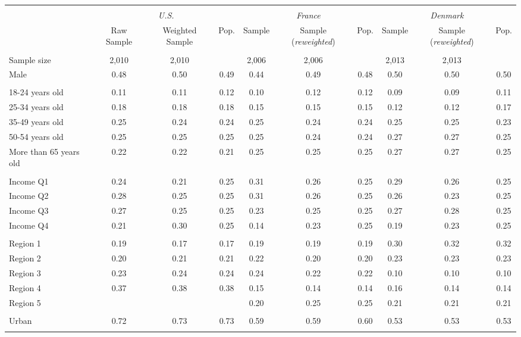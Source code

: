 \begin{tabular}{lccccccccc}
\toprule
\hline \\[-1.8ex]
\multicolumn{1}{c}{\em{ }} & \multicolumn{3}{c}{\em{U.S.}} & \multicolumn{3}{c}{\em{France}} & \multicolumn{3}{c}{\em{Denmark}}\\
\cmidrule(l{3pt}r{3pt}){2-4} \cmidrule(l{3pt}r{3pt}){5-7} \cmidrule(l{3pt}r{3pt}){8-10}
\noalign{\smallskip}  & Raw Sample & Weighted Sample & Pop. & Sample & Sample (\textit{reweighted}) & Pop. & Sample & Sample (\textit{reweighted}) & Pop. \\
\hline \\[-1.8ex] 
Sample size & 2,010 & 2,010 & & 2,006 & 2,006 &  & 2,013 & 2,013 & \\
\noalign{\smallskip}\hline \noalign{\smallskip}Male & 0.48 & 0.50 & 0.49 & 0.44 & 0.49 & 0.48 & 0.50 & 0.50 & 0.50\\ 
\\
18-24 years old & 0.11 & 0.11 & 0.12 & 0.10 & 0.12 & 0.12 & 0.09 & 0.09 & 0.11\\
25-34 years old & 0.18 & 0.18 & 0.18 & 0.15 & 0.15 & 0.15 & 0.12 & 0.12 & 0.17\\
35-49 years old & 0.25 & 0.24 & 0.24 & 0.25 & 0.24 & 0.24 & 0.25 & 0.25 & 0.23\\
50-54 years old & 0.25 & 0.25 & 0.25 & 0.25 & 0.24 & 0.24 & 0.27 & 0.27 & 0.25\\
More than 65 years old & 0.22 & 0.22 & 0.21 & 0.25 & 0.25 & 0.25 & 0.27 & 0.27 & 0.25\\ 
\\
Income Q1 & 0.24 & 0.21 & 0.25 & 0.31 & 0.26 & 0.25 & 0.29 & 0.26 & 0.25\\
Income Q2 & 0.28 & 0.25 & 0.25 & 0.31 & 0.26 & 0.25 & 0.26 & 0.23 & 0.25\\
Income Q3 & 0.27 & 0.25 & 0.25 & 0.23 & 0.25 & 0.25 & 0.27 & 0.28 & 0.25\\
Income Q4 & 0.21 & 0.30 & 0.25 & 0.14 & 0.23 & 0.25 & 0.19 & 0.23 & 0.25\\
\\
Region 1 & 0.19 & 0.17 & 0.17 & 0.19 & 0.19 & 0.19 & 0.30 & 0.32 & 0.32\\
Region 2 & 0.20 & 0.21 & 0.21 & 0.22 & 0.20 & 0.20 & 0.23 & 0.23 & 0.23\\
Region 3 & 0.23 & 0.24 & 0.24 & 0.24 & 0.22 & 0.22 & 0.10 & 0.10 & 0.10\\
Region 4 & 0.37 & 0.38 & 0.38 & 0.15 & 0.14 & 0.14 & 0.16 & 0.14 & 0.14\\
Region 5 & &  &  & 0.20 & 0.25 & 0.25 & 0.21 & 0.21 & 0.21\\
\\
Urban & 0.72 & 0.73 & 0.73 & 0.59 & 0.59 & 0.60 & 0.53 & 0.53 & 0.53\\
\\
\bottomrule
\end{tabular}